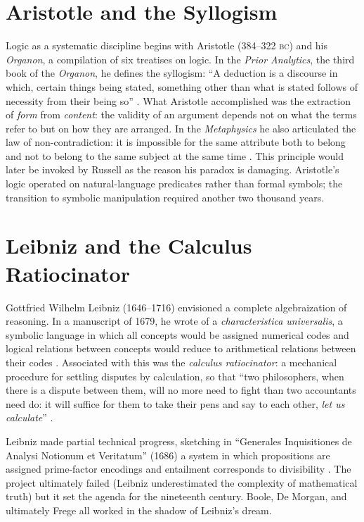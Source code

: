 \documentclass[12pt]{article}
\theoremstyle{definition}
\begin{document}
\section{Aristotle and the Syllogism}

Logic as a systematic discipline begins with Aristotle (384--322 \textsc{bc}) and his \emph{Organon}, a compilation of six treatises on logic. In the \emph{Prior Analytics}, the third book of the \emph{Organon}, he defines the syllogism: ``A deduction is a discourse in which, certain things being stated, something other than what is stated follows of necessity from their being so'' \cite{aristotle_prior}. What Aristotle accomplished was the extraction of \emph{form} from \emph{content}: the validity of an argument depends not on what the terms refer to but on how they are arranged. In the \emph{Metaphysics} he also articulated the law of non-contradiction: it is impossible for the same attribute both to belong and not to belong to the same subject at the same time \cite{aristotle_metaphysics}. This principle would later be invoked by Russell as the reason his paradox is damaging. Aristotle's logic operated on natural-language predicates rather than formal symbols; the transition to symbolic manipulation required another two thousand years.


\section{Leibniz and the Calculus Ratiocinator}

Gottfried Wilhelm Leibniz (1646--1716) envisioned a complete algebraization of reasoning. In a manuscript of 1679, he wrote of a \emph{characteristica universalis}, a symbolic language in which all concepts would be assigned numerical codes and logical relations between concepts would reduce to arithmetical relations between their codes \cite{leibniz_logical}. Associated with this was the \emph{calculus ratiocinator}: a mechanical procedure for settling disputes by calculation, so that ``two philosophers, when there is a dispute between them, will no more need to fight than two accountants need do: it will suffice for them to take their pens and say to each other, \emph{let us calculate}'' \cite{leibniz_logical}.

Leibniz made partial technical progress, sketching in ``Generales Inquisitiones de Analysi Notionum et Veritatum'' (1686) a system in which propositions are assigned prime-factor encodings and entailment corresponds to divisibility \cite{leibniz_logical}. The project ultimately failed (Leibniz underestimated the complexity of mathematical truth) but it set the agenda for the nineteenth century. Boole, De Morgan, and ultimately Frege all worked in the shadow of Leibniz's dream.
\end{document}
